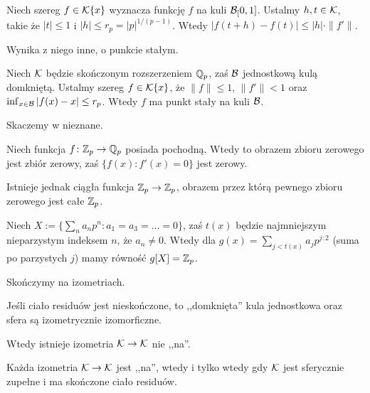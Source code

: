 \begin{fakt}
	Niech  szereg $f \in \mathcal K\{x\}$ wyznacza funkcję $f$ na kuli $\mathcal B_[0, 1]$.
	Ustalmy $h, t \in \mathcal K$, takie że $|t| \le 1$ i $|h| \le r_p = |p|^{1 / (p-1)}$.
	Wtedy $|f(t+h) - f(t)| \le |h| \cdot \|f'\|$.
\end{fakt}

Wynika z niego inne, o punkcie stałym.
\begin{fakt}
	Niech $\mathcal K$ będzie skończonym rozszerzeniem $\mathbb Q_p$, zaś $\mathcal B$ jednostkową kulą domkniętą.
	Ustalmy szereg $f \in \mathcal K \{x\}$, że $\|f\| \le 1$, $\|f'\| < 1$ oraz $\inf_{x \in \mathcal B} |f(x) - x| \le r_p$.
	Wtedy $f$ ma punkt stały na kuli $\mathcal B$.
\end{fakt}

Skaczemy w nieznane.

\begin{twierdzenie}[Łuzin]
	Niech  funkcja $f \colon \mathbb Z_p \to \mathbb Q_p$ posiada pochodną.
	Wtedy to obrazem zbioru zerowego jest zbiór zerowy, zaś $\{f(x) : f'(x) = 0\}$ jest zerowy.
\end{twierdzenie}

Istnieje jednak ciągła funkcja $\mathbb Z_p \to \mathbb Z_p$, obrazem przez którą pewnego zbioru zerowego jest całe $\mathbb Z_p$.

\begin{przyklad}
	Niech $X := \{\sum_{n} a_n p^n : a_1 = a_3 = \ldots = 0\}$, zaś $t(x)$ będzie najmniejszym nieparzystym indeksem $n$, że $a_n \neq 0$.
	Wtedy dla $g(x) = \sum_{j <t(x)} a_j p^{j:2}$ (suma po parzystych $j$) mamy równość $g[X] = \mathbb Z_p$.
\end{przyklad}

Skończymy na izometriach. 

\begin{fakt}
	Jeśli  ciało residuów jest nieskończone, to ,,domknięta'' kula jednostkowa oraz sfera są izometrycznie izomorficzne.
\end{fakt}

\begin{wniosek}
	Wtedy istnieje izometria $\mathcal K \to \mathcal K$ nie ,,na''.
\end{wniosek}
	
\begin{fakt}
	Każda izometria $\mathcal K \to \mathcal K$ jest ,,na'', wtedy i tylko wtedy gdy $\mathcal K$ jest sferycznie zupełne i ma skończone ciało residuów.
\end{fakt}

